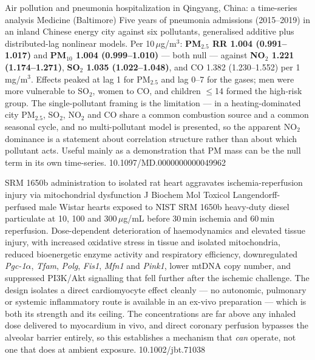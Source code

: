 \documentclass[10pt]{article}
\begin{document}
{Air pollution and pneumonia hospitalization in Qingyang, China: a time-series analysis}
{Medicine (Baltimore)}
{Five years of pneumonia admissions (2015--2019) in an inland Chinese energy city against
six pollutants, generalised additive plus distributed-lag nonlinear models. Per
10\,$\mu$g/m$^3$: \textbf{PM$_{2.5}$ RR 1.004 (0.991--1.017)} and \textbf{PM$_{10}$ 1.004
(0.999--1.010)} --- both null --- against \textbf{NO$_2$ 1.221 (1.174--1.271)},
\textbf{SO$_2$ 1.035 (1.022--1.048)}, and CO 1.382 (1.230--1.552) per 1\,mg/m$^3$.
Effects peaked at lag 1 for PM$_{2.5}$ and lag 0--7 for the gases; men were more
vulnerable to SO$_2$, women to CO, and children $\leq$14 formed the high-risk group. The
single-pollutant framing is the limitation --- in a heating-dominated city PM$_{2.5}$,
SO$_2$, NO$_2$ and CO share a common combustion source and a common seasonal cycle, and
no multi-pollutant model is presented, so the apparent NO$_2$ dominance is a statement
about correlation structure rather than about which pollutant acts. Useful mainly as a
demonstration that PM mass can be the null term in its own time-series.}
{10.1097/MD.0000000000049962}


{SRM 1650b administration to isolated rat heart aggravates ischemia-reperfusion injury
via mitochondrial dysfunction}
{J Biochem Mol Toxicol}
{Langendorff-perfused male Wistar hearts exposed to NIST SRM 1650b heavy-duty diesel
particulate at 10, 100 and 300\,$\mu$g/mL before 30\,min ischemia and 60\,min
reperfusion. Dose-dependent deterioration of haemodynamics and elevated tissue injury,
with increased oxidative stress in tissue and isolated mitochondria, reduced bioenergetic
enzyme activity and respiratory efficiency, downregulated \textit{Pgc-1$\alpha$},
\textit{Tfam}, \textit{Polg}, \textit{Fis1}, \textit{Mfn1} and \textit{Pink1}, lower mtDNA
copy number, and suppressed PI3K/Akt signalling that fell further after the ischemic
challenge. The design isolates a direct cardiomyocyte effect cleanly --- no autonomic,
pulmonary or systemic inflammatory route is available in an ex-vivo preparation --- which
is both its strength and its ceiling. The concentrations are far above any inhaled dose
delivered to myocardium in vivo, and direct coronary perfusion bypasses the alveolar
barrier entirely, so this establishes a mechanism that \emph{can} operate, not one that
does at ambient exposure.}
{10.1002/jbt.71038}
\end{document}
